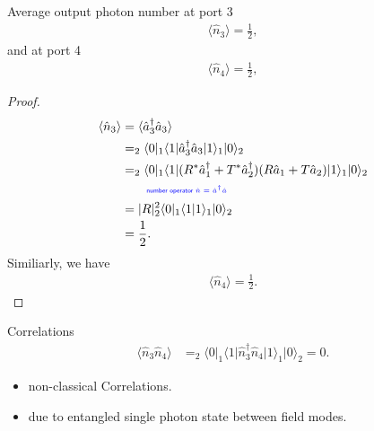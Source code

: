 \documentclass[../../note.tex]{subfiles}
\begin{document}
\begin{lemma}
    Average output photon number at port 3
    \begin{align}
        \langle \hat{n}_3 \rangle = \frac{1}{2},
    \end{align}
    and at port 4
    \begin{align}
        \langle \hat{n}_4 \rangle = \frac{1}{2},
    \end{align}
\end{lemma}
\begin{proof}
    \begin{align}
        \langle \hat{n}_3 \rangle 
        &= \langle \hat{a}_3^\dagger \hat{a}_3 \rangle \\
        &= _2\langle 0 \vert _1\langle 1 \vert \hat{a}_3^\dagger \hat{a}_3 \vert 1 \rangle_1 \vert 0 \rangle_2 \\
        &= _2\langle 0 \vert _1\langle 1 \vert (R^\ast \hat{a}_1^\dagger + T^\ast \hat{a}_2^\dagger)(R \hat{a}_1 + T \hat{a}_2)\vert 1 \rangle_1 \vert 0 \rangle_2 \\
        &\qquad\text{\color{blue}{\tiny\sffamily number operator $\hat{n} = \hat{a}^\dagger \hat{a}$}} \nonumber \\
        &= \vert R \vert^2 _2\langle 0 \vert _1\langle 1 \vert  1 \rangle_1 \vert 0 \rangle_2 \\
        &= \frac{1}{2}.
    \end{align}
    Similiarly, we have
    \begin{align}
        \langle \hat{n}_4 \rangle = \frac{1}{2}.
    \end{align}
\end{proof}

\begin{lemma}
    Correlations
    \begin{align}
        \langle \hat{n}_3 \hat{n}_4 \rangle&= _2\langle 0 \vert _1\langle 1 \vert \hat{n}_3^\dagger \hat{n}_4 \vert 1 \rangle_1 \vert 0 \rangle_2 = 0.
    \end{align}
\end{lemma}

\begin{remark}
    \begin{itemize}
        \item non-classical Correlations.
        \item due to entangled single photon state between field modes.
    \end{itemize}
\end{remark}
\end{document}
